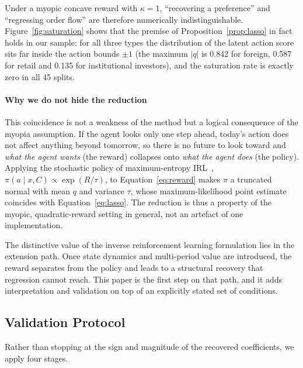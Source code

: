Under a myopic concave reward with $\kappa=1$, ``recovering a preference'' and
``regressing order flow'' are therefore numerically indistinguishable.
Figure~\ref{fig:saturation} shows that the premise of
Proposition~\ref{prop:lasso} in fact holds in our sample: for all three types the
distribution of the latent action score sits far inside the action bounds
$\pm1$ (the maximum $|q|$ is 0.842 for foreign, 0.587 for retail and 0.135 for
institutional investors), and the saturation rate is exactly zero in all 45
splits.

\paragraph{Why we do not hide the reduction}
This coincidence is not a weakness of the method but a logical consequence of
the myopia assumption. If the agent looks only one step ahead, today's action
does not affect anything beyond tomorrow, so there is no future to look toward
and \emph{what the agent wants} (the reward) collapses onto \emph{what the agent
does} (the policy). Applying the stochastic policy of maximum-entropy
IRL~\cite{ziebart2008maximum}, $\pi(a\mid x,C)\propto\exp(R/\tau)$, to
Equation~\eqref{eq:reward} makes $\pi$ a truncated normal with mean $q$ and
variance $\tau$, whose maximum-likelihood point estimate coincides with
Equation~\eqref{eq:lasso}. The reduction is thus a property of the myopic,
quadratic-reward setting in general, not an artefact of one implementation.

The distinctive value of the inverse reinforcement learning formulation lies in
the extension path. Once state dynamics and multi-period value are introduced,
the reward separates from the policy and leads to a structural recovery that
regression cannot reach. This paper is the first step on that path, and it adds
interpretation and validation on top of an explicitly stated set of conditions.

\subsection{Validation Protocol}
\label{sec:protocol}

Rather than stopping at the sign and magnitude of the recovered coefficients, we
apply four stages.


